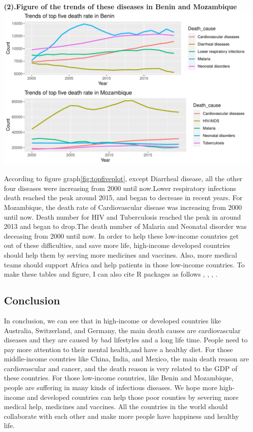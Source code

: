\documentclass[11pt,a4paper,]{article}
\begin{document}
\textbf{(2).Figure of the trends of these diseases in Benin and Mozambique}
\includegraphics{Assignment4_files/figure-latex/topfiveplot-1.pdf}

According to figure graph\ref{fig:topfiveplot}, except Diarrheal disease, all the other four diseases were increasing from 2000 until now.Lower respiratory infections death reached the peak around 2015, and began to decrease in recent years.
For Mozambique, the death rate of Cardiovascular disease was increasing from 2000 until now. Death number for HIV and Tuberculosis reached the peak in around 2013 and began to drop.The death number of Malaria and Neonatal disorder was deceasing from 2000 until now.
In order to help these low-income countries get out of these difficulties, and save more life, high-income developed countries should help them by serving more medicines and vaccines. Also, more medical teams should support Africa and help patients in those low-income countries.
To make these tables and figure, I can also cite R packages as follows \textcite{tidyverse}, \textcite{ggplot2}, \textcite{readr}, \textcite{gridExtra}.

\clearpage

\hypertarget{conclusion}{%
\subsection{Conclusion}\label{conclusion}}

In conclusion, we can see that in high-income or developed countries like Australia, Switzerland, and Germany, the main death causes are cardiovascular diseases and they are caused by bad lifestyles and a long life time. People need to pay more attention to their mental health,and have a healthy diet. For those middle-income countries like China, India, and Mexico, the main death reason are cardiovascular and cancer, and the death reason is very related to the GDP of these countries. For those low-income countries, like Benin and Mozambique, people are suffering in many kinds of infectious diseases. We hope more high-income and developed countries can help those poor counties by severing more medical help, medicines and vaccines. All the countries in the world should collaborate with each other and make more people have happiness and healthy life.

\printbibliography
\end{document}
